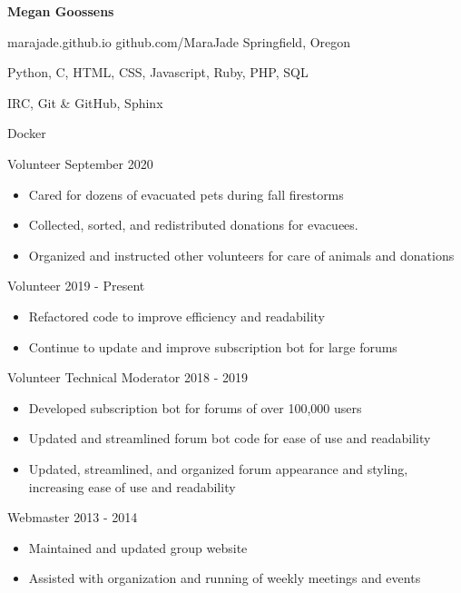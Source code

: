 \documentclass[11pt]{article} %
\begin{document}
\centerline{{\Huge \bf Megan Goossens}}
\bigskip


        {marajade.github.io}
        {github.com/MaraJade}
        {Springfield, Oregon}



      {Python, C, HTML, CSS, Javascript, Ruby, PHP, SQL}

      {IRC, Git \& GitHub, Sphinx}

      {Docker}


\begin{description}
\squish
{}
           {Volunteer}
           {September 2020}

\begin{itemize}
  \item Cared for dozens of evacuated pets during fall firestorms
  \item Collected, sorted, and redistributed donations for evacuees.
  \item Organized and instructed other volunteers for care of animals and
    donations
\end{itemize}


            {Volunteer}
            {2019 - Present}

\begin{itemize}
  \item Refactored code to improve efficiency and readability
  \item Continue to update and improve subscription bot for large forums
\end{itemize}


            {Volunteer Technical Moderator}
            {2018 - 2019}

\begin{itemize}
  \item Developed subscription bot for forums of over 100,000 users
  \item Updated and streamlined forum bot code for ease of use and readability
  \item Updated, streamlined, and organized forum appearance and styling,
    increasing ease of use and readability
\end{itemize}

           {Webmaster}
           {2013 - 2014}

\begin{itemize}
  \item Maintained and updated group website
  \item Assisted with organization and running of weekly meetings and events
\end{itemize}

\end{description}
\end{document}
